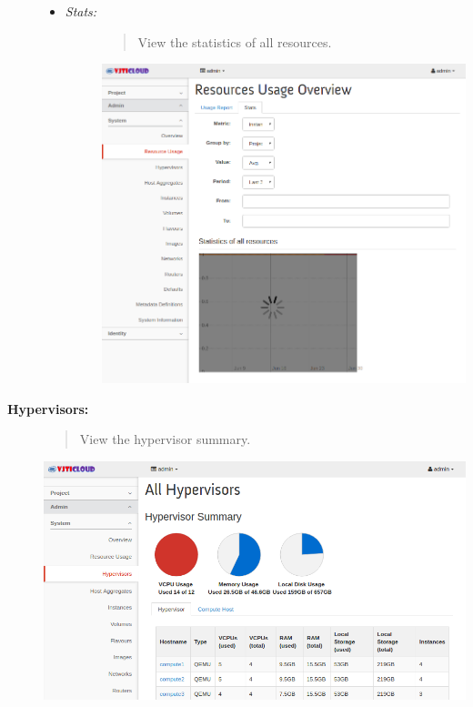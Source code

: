 \documentclass[letterpaper,10pt,english]{sphinxmanual}
\begin{document}
\begin{description}
\begin{itemize}
\begin{description}
\end{description}

\item {} \begin{description}
\item[{\emph{Stats:}}] \leavevmode\begin{quote}

View the statistics of all resources.
\end{quote}

\includegraphics{sys_resource_stats.png}

\end{description}

\end{itemize}

\item[{\textbf{Hypervisors:}}] \leavevmode\begin{quote}

View the hypervisor summary.
\end{quote}

\includegraphics{sys_hypervisors.png}


\end{description}
\end{document}
